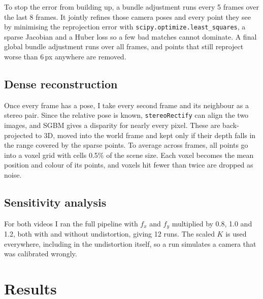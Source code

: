 \documentclass[conference]{assets/latex/IEEEtran}
\begin{document}
To stop the error from building up, a bundle adjustment runs every 5 frames over the last 8
frames. It jointly refines those camera poses and every point they see by minimising the
reprojection error with \texttt{scipy.optimize.least\_squares}, a sparse Jacobian and a Huber
loss so a few bad matches cannot dominate. A final global bundle adjustment runs over all frames,
and points that still reproject worse than 6\,px anywhere are removed.

\subsection{Dense reconstruction}
Once every frame has a pose, I take every second frame and its neighbour as a stereo pair.
Since the relative pose is known, \texttt{stereoRectify} can align the two images, and SGBM gives
a disparity for nearly every pixel. These are back-projected to 3D, moved into the world frame
and kept only if their depth falls in the range covered by the sparse points. To average across
frames, all points go into a voxel grid with cells 0.5\% of the scene size. Each voxel becomes
the mean position and colour of its points, and voxels hit fewer than twice are dropped as noise.

\subsection{Sensitivity analysis}
For both videos I ran the full pipeline with $f_x$ and $f_y$ multiplied by 0.8, 1.0 and 1.2, both
with and without undistortion, giving 12 runs. The scaled $K$ is used everywhere, including in
the undistortion itself, so a run simulates a camera that was calibrated wrongly.

\section{Results}
\end{document}
